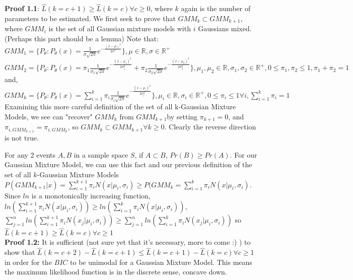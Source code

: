 \documentclass{article}
\begin{document}
\textbf{Proof 1.1}: \(\hat{L}(k = c+1) \geq \hat{L}(k = c) \forall c\geq 0\), where \(k\) again is the number of parameters to be estimated.
We first seek to prove that \(GMM_k \subset GMM_{k+1}\), where  \(GMM_i\) is the set of all Gaussian mixture models with \(i\) Gaussians mixed. (Perhaps this part should be a lemma) Note that:\\
\(GMM_1  = \{P_{\theta} : P_{\theta}(x) = \frac{1}{\sigma \sqrt{2\pi}} e^{ - \frac{(x - \mu)^2}{2\sigma^2}} \}, \mu \in \mathbb{R}, \sigma \in \mathbb{R}^+\)\\
\(GMM_2 = \{P_{\theta} : P_{\theta}(x) = \pi_1 \frac{1}{\sigma_1 \sqrt{2\pi}} e^{ - \frac{(x - \mu_1)^2}{2\sigma_1^2}} + \pi_2 \frac{1}{\sigma_2 \sqrt{2\pi}} e^{ - \frac{(x - \mu_2)^2}{2\sigma_2^2}} \}, \mu_1, \mu_2 \in \mathbb{R}, \sigma_1, \sigma_2 \in \mathbb{R}^+ , 0 \leq \pi_1, \pi_2 \leq 1, \pi_1 + \pi_2 = 1\)\\
and, 
\(GMM_k = \{P_{\theta} : P_{\theta}(x) = \sum_{i=1}^k \pi_i \frac{1}{\sigma_i \sqrt{2\pi}} e^{ - \frac{(x - \mu_i)^2}{2\sigma_i^2}}  \}, \mu_i \in \mathbb{R}, \sigma_i \in \mathbb{R}^+ , 0 \leq \pi_i \leq 1\forall i, \sum_{i=1}^k \pi_i = 1\)\\

Examining this more careful definition of the set of all k-Gaussian Mixture Models, we see can "recover" \(GMM_k\) from \(GMM_{k+1}\)by setting \(\pi_{k+1} = 0\), and \(\pi_{i, GMM_{k+1}} = \pi_{i, GMM_k}\), so \(GMM_k \subset GMM_{k+1} \forall k \geq 0\). Clearly the reverse direction is not true.

For any 2 events \(A, B\) in a sample space \(S\), if \(A \subset B\), \(Pr(B) \geq Pr(A)\). For our Gaussian Mixture Model, we can use this fact and our previous definition of the set of all \(k\)-Gaussian Mixture Models \(P(GMM_{k+1} | x) =  \sum_{i=1}^{k+1} \pi_i N(x | \mu_i, \sigma_i) \geq P(GMM_{k}  =  \sum_{i=1}^k \pi_i N(x | \mu_i, \sigma_i)\). Since \(ln\) is a monotonically increasing function,  \(ln(\sum_{i=1}^{k+1} \pi_i N(x | \mu_i, \sigma_i)) \geq  ln(\sum_{i=1}^k \pi_i N(x | \mu_i, \sigma_i))\), \\
 \( \sum_{j=1}^n ln (\sum_{i=1}^{k+1} \pi_i N(x_j | \mu_i, \sigma_i) )\geq  \sum_{j=1}^n ln (\sum_{i=1}^{k} \pi_i N(x_j | \mu_i, \sigma_i) )\) so \(\hat{L}(k = c+1) \geq \hat{L}(k = c) \forall c\geq 1 \)\\
 
 \textbf{Proof 1.2:} It is sufficient (not sure yet that it's necessary, more to come :) ) to show that \(\hat{L}(k = c+2) - \hat{L}(k = c +1) \leq \hat{L}(k = c+1) - \hat{L}(k = c) \forall c \geq 1\) in order for the \(BIC\) to be unimodal for a Gaussian Mixture Model. This means the maximum likelihood function is in the discrete sense, concave down. \\
\end{document}
